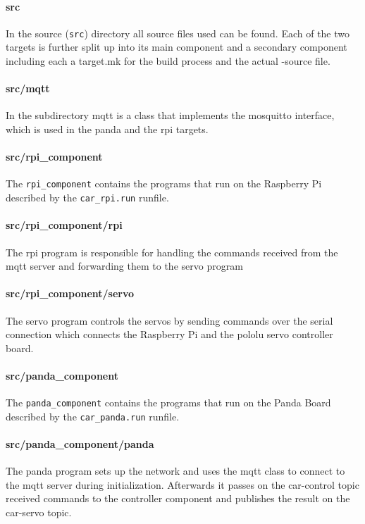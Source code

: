 \paragraph{src}
In the source (\texttt{src}) directory all source files used can be found.
Each of the two targets is further split up into its main component and a secondary component including each a target.mk for the build process and the actual \CC-source file.

\paragraph{src/mqtt}
In the subdirectory mqtt is a class that implements the mosquitto interface, which is used in the panda and the rpi targets.

\paragraph{src/rpi\_component}
The \texttt{rpi\_component} contains the programs that run on the Raspberry Pi described by the \texttt{car\_rpi.run} runfile.

\paragraph{src/rpi\_component/rpi}
The rpi program is responsible for handling the commands received from the mqtt server and forwarding them to the servo program

\paragraph{src/rpi\_component/servo}
The servo program controls the servos by sending commands over the serial connection which connects the Raspberry Pi and the pololu servo controller board.

\paragraph{src/panda\_component}
The \texttt{panda\_component} contains the programs that run on the Panda Board described by the \texttt{car\_panda.run} runfile.

\paragraph{src/panda\_component/panda}
The panda program sets up the network and uses the mqtt class to connect to the mqtt server during initialization. Afterwards it passes on the car-control topic received commands to the controller component and publishes the result on the car-servo topic.

